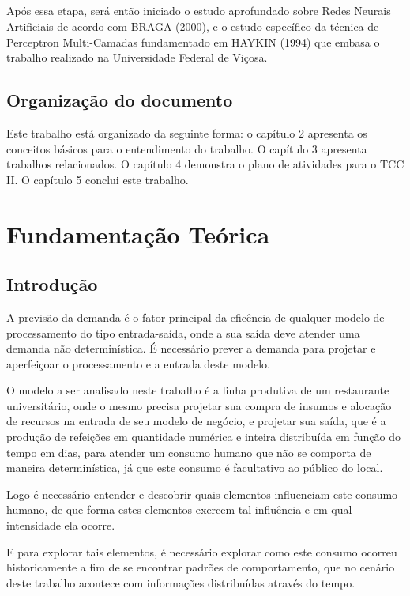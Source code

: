 \documentclass[	12pt, Times, openright, twoside, a4paper, english, brazil]{abntex2}
\begin{document}
\paragraph*{}
Após essa etapa, será então iniciado o estudo aprofundado sobre Redes Neurais Artificiais de acordo com BRAGA (2000), e o estudo específico da técnica de Perceptron Multi-Camadas fundamentado em HAYKIN (1994) que embasa o trabalho realizado na Universidade Federal de Viçosa.

\section{Organização do documento}
Este trabalho está organizado da seguinte forma: o capítulo 2 apresenta os conceitos básicos para o entendimento do trabalho. O capítulo 3 apresenta trabalhos relacionados. O capítulo 4 demonstra o plano de atividades para o TCC II. O capítulo 5 conclui este trabalho.
\chapter{Fundamentação Teórica}
\section{Introdução}
A previsão da demanda é o fator principal da eficência de qualquer modelo de processamento do tipo entrada-saída, onde a sua saída deve atender uma demanda não determinística. É necessário prever a demanda para projetar e aperfeiçoar o processamento e a entrada deste modelo. 

O modelo a ser analisado neste trabalho é a linha produtiva de um restaurante universitário, onde o mesmo precisa projetar sua compra de insumos e alocação de recursos na entrada de seu modelo de negócio, e projetar sua saída, que é a produção de refeições em quantidade numérica e inteira distribuída em função do tempo em dias, para atender um consumo humano que não se comporta de maneira determinística, já que este consumo é facultativo ao público do local.

Logo é necessário entender e descobrir quais elementos influenciam este consumo humano, de que forma estes elementos exercem tal influência e em qual intensidade ela ocorre.

E para explorar tais elementos, é necessário explorar como este consumo ocorreu historicamente a fim de se encontrar padrões de comportamento, que no cenário deste trabalho acontece com informações distribuídas através do tempo. 
\end{document}
